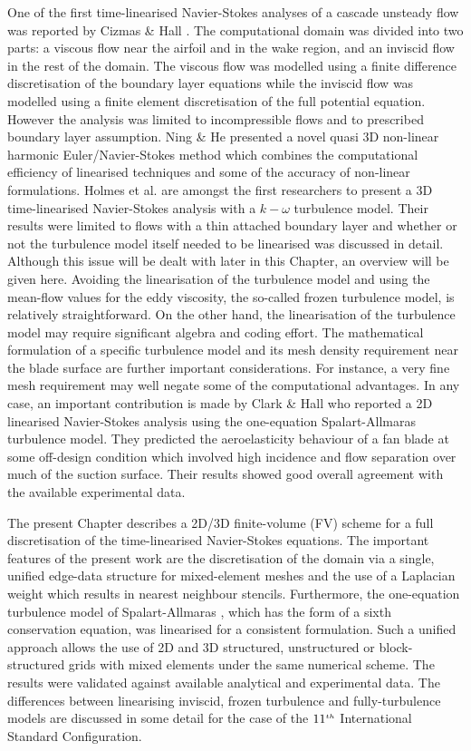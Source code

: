  One of the first time-linearised Navier-Stokes analyses of a cascade unsteady flow was
 reported by Cizmas \& Hall \citeyear{Hall:7}. The computational domain was
 divided into two parts: a viscous flow near the airfoil and in the wake region,
 and an inviscid flow in the rest of the domain.
 The viscous flow was modelled using a finite difference discretisation of the
 boundary layer equations while the inviscid flow was modelled
 using a finite element discretisation of the full potential equation.
 However the analysis was limited to incompressible flows and to prescribed
 boundary layer assumption. Ning \& He \citeyear{He:3} presented a novel quasi 3D non-linear
 harmonic Euler/Navier-Stokes method which combines the computational efficiency
 of linearised techniques and some of the accuracy of non-linear formulations.  
 Holmes et al. \citeyear{Holmes:1} are amongst the first researchers to present a 3D
 time-linearised Navier-Stokes analysis with a $k-\omega$ turbulence model.
 Their results were limited to flows with a thin attached boundary layer and
 whether or not the turbulence model itself needed to be linearised was discussed
 in detail. Although this issue will be dealt with later in this Chapter,
 an overview will be given here. 
 Avoiding the linearisation of the turbulence model and using the mean-flow
 values for the eddy viscosity, the so-called frozen turbulence model,
 is relatively straightforward.
 On the other hand, the linearisation of the turbulence model may require
 significant algebra and coding effort. The mathematical formulation of a specific turbulence
 model and its mesh density requirement near the blade surface are further
 important considerations. For instance, a very fine mesh requirement may well
 negate some of the computational advantages. 
 In any case, an important contribution is made by Clark \& Hall \citeyear{Hall:8}
 who reported a 2D linearised Navier-Stokes analysis using the one-equation
 Spalart-Allmaras \citeyear{Spalart:1} turbulence model.
 They predicted the aeroelasticity behaviour of a fan blade
 at some off-design condition which involved high incidence and 
 flow separation over much of the suction surface.
 Their results showed good overall agreement with the available experimental data.

 The present Chapter describes a 2D/3D finite-volume (FV) scheme for a full discretisation of
 the time-linearised Navier-Stokes equations. The important features of the present work
 are the discretisation of the domain via a single, unified edge-data structure
 for mixed-element meshes and the use of a Laplacian weight which
 results in nearest neighbour stencils. Furthermore,  the one-equation turbulence model of
 Spalart-Allmaras \citeyear{Spalart:1}, which has the form of a sixth conservation equation,
 was linearised for a consistent formulation. Such a unified approach
 allows the use of 2D and 3D structured, unstructured or block-structured
 grids with mixed elements under the same numerical scheme.
 The results were validated against available analytical and experimental data.
 The differences between linearising inviscid, frozen turbulence and fully-turbulence
 models are discussed in some detail for the case of the
 $11^{\mbox{\tiny $th$}}$ International Standard Configuration. 
%
%
%
%
%
